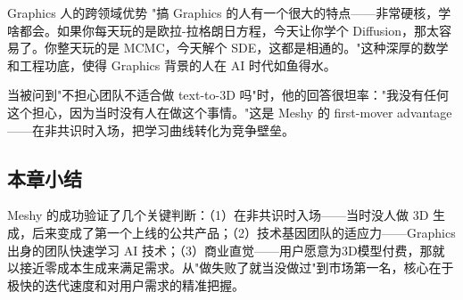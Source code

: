 \begin{knowledgebox}{Graphics 人的跨领域优势}
"搞 Graphics 的人有一个很大的特点——非常硬核，学啥都会。如果你每天玩的是欧拉-拉格朗日方程，今天让你学个 Diffusion，那太容易了。你整天玩的是 MCMC，今天解个 SDE，这都是相通的。"这种深厚的数学和工程功底，使得 Graphics 背景的人在 AI 时代如鱼得水。
\end{knowledgebox}

当被问到"不担心团队不适合做 text-to-3D 吗"时，他的回答很坦率："我没有任何这个担心，因为当时没有人在做这个事情。"这是 Meshy 的 first-mover advantage——在非共识时入场，把学习曲线转化为竞争壁垒。

\subsection{本章小结}

Meshy 的成功验证了几个关键判断：（1）在非共识时入场——当时没人做 3D 生成，后来变成了第一个上线的公共产品；（2）技术基因团队的适应力——Graphics 出身的团队快速学习 AI 技术；（3）商业直觉——用户愿意为3D模型付费，那就以接近零成本生成来满足需求。从"做失败了就当没做过"到市场第一名，核心在于极快的迭代速度和对用户需求的精准把握。

